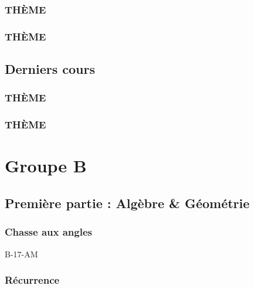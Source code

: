 \documentclass[poly,trombi]{valbonne}
\begin{document}

\subsection{THÈME}


\subsection{THÈME}






\section{Derniers cours}

\subsection{THÈME}


\subsection{THÈME}


\chapter{Groupe B}

\minitoc \clearpage

\section{Première partie : Algèbre \& Géométrie}

\subsection{Chasse aux angles}

{B-17-AM}

\subsection{Récurrence}
\end{document}
